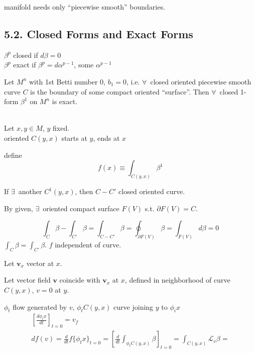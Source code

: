 manifold needs only ``piecewise smooth'' boundaries.  



\subsection{ 5.2. Closed Forms and Exact Forms }

$\beta^p$ closed if $d\beta = 0$ \\ 
 $ \beta^p$ exact if $\beta^p = d\alpha^{p-1}$, some $\alpha^{p-1}$

\begin{theorem}[5.3] Let $M^n$ with 1st Betti number 0, $b_1 = 0$, i.e. $\forall \, $ closed oriented piecewise smooth curve $C$ is the boundary of some compact oriented ``surface''.  Then $\forall \, $ closed 1-form $\beta^1$ on $M^n$ is exact.
\end{theorem}


\hrulefill \\


        Let $x,y \in M$, $y$ fixed.  \\
        oriented $C(y,x)$ starts at $y$, ends at $x$ 

define 
\[
f(x) \equiv \int_{C(y,x)} \beta^1
\]

If $\exists \, $ another $C^1(y,x)$, then $C- C'$ closed oriented curve.  

By given, $\exists \, $ oriented compact surface $F(V)$ s.t. $\partial F(V) = C$.  

\[
\int_C \beta - \int_{C'} \beta = \int_{C- C'} \beta = \oint_{ \partial F(V)} \beta = \int_{F(V)} d\beta = 0 
\]
$\int_C \beta = \int_{C'} \beta$.  $f$ independent of curve.  

Let $\mathbf{v}_x$ vector at $x$.  

Let vector field $\mathbf{v}$ coincide with $\mathbf{v}_x$ at $x$, defined in neighborhood of curve $C(y,x)$, $v=0$ at $y$.  

$\phi_t$ flow generated by $v$, $\phi_t C(y,x)$ curve joining $y$ to $\phi_i x$ 
\[
\begin{gathered}
        \left[ \frac{ d\phi_i x}{ dt} \right]_{t=0} = v_f \\ 
        df(v) = \frac{d}{dt} f\lbrace \phi_t x \rbrace_{t=0} = \left[ \frac{d}{dt} \int_{\phi_tC(y,x)} \beta \right]_{t=0} = \int_{ C(y,x) } \mathcal{L}_v \beta  = 
\end{gathered}
\]

